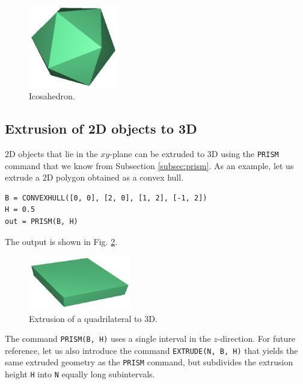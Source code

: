 \begin{figure}[!ht]
\begin{center}
\includegraphics[width=0.35\textwidth]{img/icosa-2.png}
\end{center}
\vspace{-4mm}
\caption{Icosahedron.}
\label{fig:icosa}
\end{figure}

\subsection{Extrusion of 2D objects to 3D}\label{subsec:extrusion}

2D objects that lie in the $xy$-plane can be extruded to 3D
using the {\tt PRISM} command that we know from Subsection \ref{subsec:prism}. 
As an example, let us extrude a 2D polygon obtained as a convex hull.\\

\begin{bbox}
\begin{verbatim}
B = CONVEXHULL([0, 0], [2, 0], [1, 2], [-1, 2])
H = 0.5
out = PRISM(B, H)
\end{verbatim}
\end{bbox}
\vspace{6mm}

\noindent
The output is shown in Fig. \ref{fig:extrusion-3}.\\

\begin{figure}[!ht]
\begin{center}
\includegraphics[width=0.4\textwidth]{img/extrude-3.png}
\end{center}
\vspace{-4mm}
\caption{Extrusion of a quadrilateral to 3D.}
\label{fig:extrusion-3}
\end{figure}
\noindent
The command {\tt PRISM(B, H)} uses a single interval in the $z$-direction. For future
reference, let us also introduce the command {\tt EXTRUDE(N, B, H)} that yields the same
extruded geometry as the {\tt PRISM} command, but subdivides the extrusion height {\tt H}
into {\tt N} equally long subintervals. 

